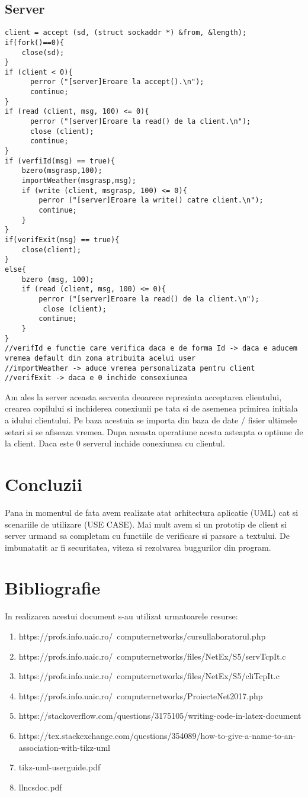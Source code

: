 \documentclass{llncs}
\begin{document}
\subsection{Server}
%
\begin{lstlisting}
client = accept (sd, (struct sockaddr *) &from, &length);
if(fork()==0){
	close(sd);
}
if (client < 0){
	  perror ("[server]Eroare la accept().\n");
	  continue;
}
if (read (client, msg, 100) <= 0){
	  perror ("[server]Eroare la read() de la client.\n");
	  close (client);	
	  continue;		
}
if (verfiId(msg) == true){
	bzero(msgrasp,100);
	importWeather(msgrasp,msg);
	if (write (client, msgrasp, 100) <= 0){
	 	perror ("[server]Eroare la write() catre client.\n");
	  	continue;		
	}
}
if(verifExit(msg) == true){
	close(client);
}
else{
	bzero (msg, 100);
	if (read (client, msg, 100) <= 0){
	  	perror ("[server]Eroare la read() de la client.\n");
	 	 close (client);	
	  	continue;		
	}
}
//verifId e functie care verifica daca e de forma Id -> daca e aducem vremea default din zona atribuita acelui user
//importWeather -> aduce vremea personalizata pentru client
//verifExit -> daca e 0 inchide consexiunea
\end{lstlisting}
%
Am ales la server aceasta secventa deoarece reprezinta acceptarea clientului, crearea copilului si inchiderea conexiunii pe tata si de asemenea
primirea initiala a idului clientului. Pe baza acestuia se importa din baza de date / fisier ultimele setari si se afiseaza vremea. Dupa aceasta operatiune
acesta asteapta o optiune de la client. Daca este 0 serverul inchide conexiunea cu clientul.
%
\section{Concluzii}
%
Pana in momentul de fata avem realizate atat arhitectura aplicatie (UML) cat si scenariile de utilizare (USE CASE). Mai mult avem si un prototip de client si server urmand sa completam cu functiile 
de verificare si parsare a textului. De imbunatatit ar fi securitatea, viteza si rezolvarea buggurilor din program.
%
\section{Bibliografie}
%
In realizarea acestui document s-au utilizat urmatoarele resurse:
%
\begin{enumerate}
\item https://profs.info.uaic.ro/~computernetworks/cursullaboratorul.php
\item https://profs.info.uaic.ro/~computernetworks/files/NetEx/S5/servTcpIt.c
\item https://profs.info.uaic.ro/~computernetworks/files/NetEx/S5/cliTcpIt.c
\item https://profs.info.uaic.ro/~computernetworks/ProiecteNet2017.php
\item https://stackoverflow.com/questions/3175105/writing-code-in-latex-document
\item https://tex.stackexchange.com/questions/354089/how-to-give-a-name-to-an-association-with-tikz-uml
\item tikz-uml-userguide.pdf
\item llncsdoc.pdf
\end{enumerate}
\end{document}
